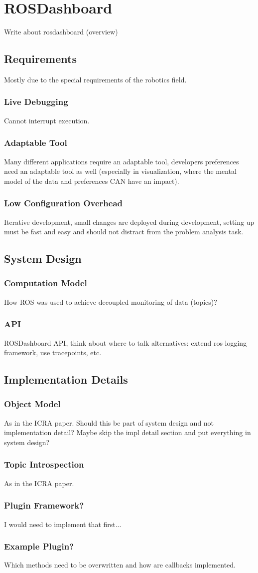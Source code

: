 \chapter{ROSDashboard}

Write about rosdashboard (overview)

\section{Requirements}
Mostly due to the special requirements of the robotics field.
\subsection{Live Debugging}
Cannot interrupt execution.
\subsection{Adaptable Tool}
Many different applications require an adaptable tool, developers preferences need an adaptable tool as well (especially in visualization, where the mental model of the data and preferences CAN have an impact).
\subsection{Low Configuration Overhead}
Iterative development, small changes are deployed during development, setting up must be fast and easy and should not distract from the problem analysis task.

\section{System Design}
\subsection{Computation Model}
How ROS was used to achieve decoupled monitoring of data (topics)?
\subsection{API}
ROSDashboard API, think about where to talk alternatives: extend ros logging framework, use tracepoints, etc.

\section{Implementation Details}
\subsection{Object Model}
As in the ICRA paper. Should this be part of system design and not implementation detail? Maybe skip the impl detail section and put everything in system design?
\subsection{Topic Introspection}
As in the ICRA paper.
\subsection{Plugin Framework?}
I would need to implement that first...
\subsection{Example Plugin?}
Which methods need to be overwritten and how are callbacks implemented.
